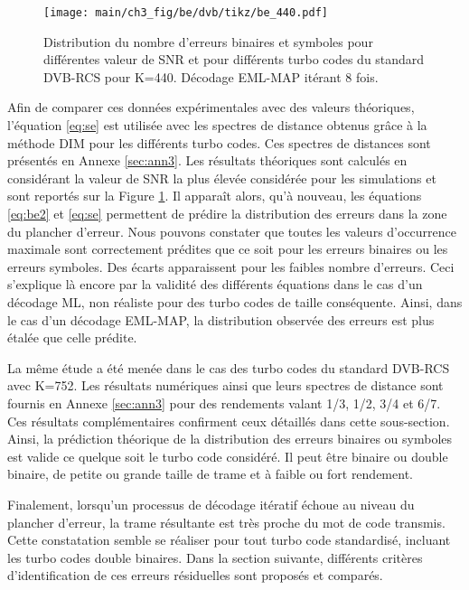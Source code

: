 \begin{figure}[!ht] 
	\centering
	\hspace*{-1cm}
	\texttt{[image: main/ch3\_fig/be/dvb/tikz/be\_440.pdf]}
	\caption{Distribution du nombre d'erreurs binaires et symboles pour différentes valeur de SNR et pour différents turbo codes du 
	standard DVB-RCS pour K=440.	Décodage EML-MAP itérant 8 fois. \label{fig:be_dvb440}}
\end{figure}


Afin de comparer ces données expérimentales avec des valeurs théoriques, l'équation \ref{eq:se} est utilisée avec les 
spectres de distance obtenus grâce à la méthode DIM pour les différents turbo codes. Ces spectres de distances sont 
présentés en Annexe \ref{sec:ann3}. Les résultats théoriques sont calculés en considérant la valeur de SNR la plus élevée 
considérée pour les simulations et sont reportés sur la Figure \ref{fig:be_dvb440}. Il apparaît alors, qu'à nouveau, les équations
\ref{eq:be2} et \ref{eq:se} permettent de prédire la distribution des erreurs dans la zone du plancher d'erreur. 
Nous pouvons constater que toutes les valeurs d’occurrence maximale sont correctement prédites que ce soit pour les erreurs binaires ou les 
erreurs symboles. Des écarts apparaissent pour les faibles nombre d'erreurs. Ceci s'explique là encore par la validité des
différents équations dans le cas d'un décodage ML, non réaliste pour des turbo codes de taille conséquente.
Ainsi, dans le cas d'un décodage EML-MAP, la distribution observée des erreurs est plus étalée que celle prédite.

La même étude a été menée dans le cas des turbo codes du standard DVB-RCS avec K=752. Les résultats numériques ainsi
que leurs spectres de distance sont fournis en Annexe \ref{sec:ann3} pour des rendements valant 1/3, 1/2, 3/4 et 6/7. 
Ces résultats complémentaires confirment ceux détaillés dans cette sous-section. Ainsi, la prédiction théorique de la distribution des erreurs binaires 
ou symboles est valide ce quelque soit le turbo code considéré. Il peut être binaire ou double binaire, de petite ou grande
taille de trame et à faible ou fort rendement.

Finalement, lorsqu'un processus de décodage itératif échoue au niveau du plancher d'erreur, la trame résultante est très proche du 
mot de code transmis. Cette constatation semble se réaliser pour tout turbo code standardisé, incluant les turbo codes
double binaires. Dans la section suivante, différents critères d'identification de ces erreurs résiduelles sont 
proposés et comparés.
\newpage
